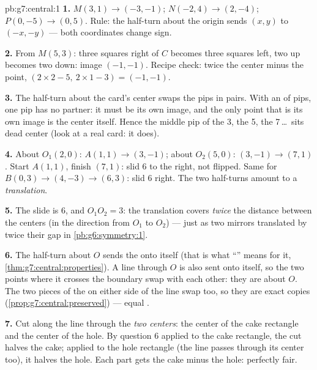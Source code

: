 \begin{solution}{pb:g7:central:1}
\textbf{1.} $M(3, 1) \to (-3, -1)$; $N(-2, 4) \to (2, -4)$;
$P(0, -5) \to (0, 5)$. Rule: the half-turn about the origin
sends $(x, y)$ to $(-x, -y)$ --- both coordinates change sign.

\textbf{2.} From $M(5, 3)$: three squares right of $C$ becomes
three squares left, two up becomes two down: image
$(-1, -1)$. Recipe check: twice the center minus the point,
$(2 \times 2 - 5,\ 2 \times 1 - 3) = (-1, -1)$.

\textbf{3.} The half-turn about the card's center swaps the pips
in pairs. With an  of pips, one pip has no partner: it
must be its own image, and the only point that is its own image
is the center itself. Hence the middle pip of the 3, the 5, the
7\,\dots\ sits dead center (look at a real card: it does).

\textbf{4.} About $O_1(2,0)$: $A(1,1) \to (3,-1)$; about
$O_2(5,0)$: $(3,-1) \to (7,1)$. Start $A(1,1)$, finish
$(7,1)$: slid $6$ to the right, not flipped. Same for
$B(0,3) \to (4,-3) \to (6,3)$: slid $6$ right. The two
half-turns amount to a \emph{translation}.

\textbf{5.} The slide is $6$, and $O_1 O_2 = 3$: the translation
covers \emph{twice} the distance between the centers (in the
direction from $O_1$ to $O_2$) --- just as two  mirrors
translated by twice their gap in \cref{pb:g6:symmetry:1}.

\textbf{6.} The half-turn about $O$ sends the  onto
itself (that is what ``'' means for it,
\cref{thm:g7:central:properties}). A line through $O$ is also
sent onto itself, so the two points where it crosses the
boundary swap with each other: they are  about $O$. The
two pieces of the  on either side of the line swap
too, so they are exact copies (\cref{prop:g7:central:preserved})
--- equal .

\textbf{7.} Cut along the line through the \emph{two centers}:
the center of the cake rectangle and the center of the hole.
By question 6 applied to the cake rectangle, the cut halves the
cake; applied to the hole rectangle (the line passes through its
center too), it halves the hole. Each part gets  the cake
minus  the hole: perfectly fair.


\end{solution}
